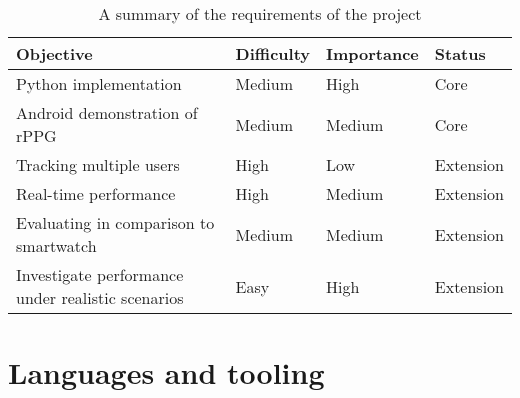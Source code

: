 \begin{table}[H]
    \centering
    \begin{tabular}{|l|l|l|l|}
    \hline
    \textbf{Objective} & \textbf{Difficulty} & \textbf{Importance} & \textbf{Status} \\ \hline
    Python implementation & {\color[HTML]{F56B00} Medium} & {\color[HTML]{CB0000} High} & {\color[HTML]{CB0000} Core} \\ \hline
    Android demonstration of rPPG & {\color[HTML]{F56B00} Medium} & {\color[HTML]{F56B00} Medium} & {\color[HTML]{CB0000} Core} \\ \hline
    Tracking multiple users & {\color[HTML]{CB0000} High} & {\color[HTML]{009901} Low} & {\color[HTML]{009901} Extension} \\ \hline
    Real-time performance & {\color[HTML]{CB0000} High} & {\color[HTML]{F56B00} Medium} & {\color[HTML]{009901} Extension} \\ \hline
    Evaluating in comparison to smartwatch & {\color[HTML]{F56B00} Medium} & {\color[HTML]{F56B00} Medium} & {\color[HTML]{009901} Extension} \\ \hline
    Investigate performance under realistic scenarios& {\color[HTML]{009901} Easy} & {\color[HTML]{CB0000} High} & {\color[HTML]{009901} Extension} \\ \hline
    \end{tabular}
    \caption{A summary of the requirements of the project}
\end{table}



\section{Languages and tooling}
